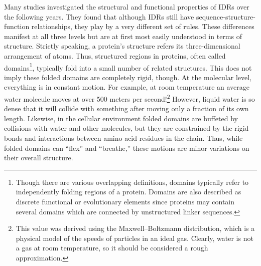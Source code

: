 Many studies investigated the structural and functional properties of IDRs over the following years. They found that although IDRs still have sequence-structure-function relationships, they play by a very different set of rules. These differences manifest at all three levels but are at first most easily understood in terms of structure. Strictly speaking, a protein's structure refers its three-dimensional arrangement of atoms. Thus, structured regions in proteins, often called domains\footnote{Though there are various overlapping definitions, domains typically refer to independently folding regions of a protein. Domains are also described as discrete functional or evolutionary elements since proteins may contain several domains which are connected by unstructured linker sequences.}, typically fold into a small number of related structures. This does not imply these folded domains are completely rigid, though. At the molecular level, everything is in constant motion. For example, at room temperature an average water molecule moves at over 500 meters per second!\footnote{This value was derived using the Maxwell–Boltzmann distribution, which is a physical model of the speeds of particles in an ideal gas. Clearly, water is not a gas at room temperature, so it should be considered a rough approximation.} However, liquid water is so dense that it will collide with something after moving only a fraction of its own length. Likewise, in the cellular environment folded domains are buffeted by collisions with water and other molecules, but they are constrained by the rigid bonds and interactions between amino acid residues in the chain. Thus, while folded domains can ``flex'' and ``breathe,'' these motions are minor variations on their overall structure.

